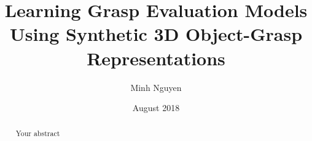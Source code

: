 \documentclass[rnd]{mas_report}
\author{Minh Nguyen}
\title{Learning Grasp Evaluation Models Using Synthetic 3D Object-Grasp Representations}
\date{August 2018}
\begin{document}
\begin{titlepage}
    \maketitle
\end{titlepage}


\pagestyle{plain}


\cleardoublepage
\statementpage

\begin{abstract}
Your abstract
\end{abstract}

\tableofcontents
\listoffigures
\listoftables


\mainmatter %

\pagestyle{mainmatter}









\begin{appendices}


\end{appendices}

\backmatter



\end{document}
